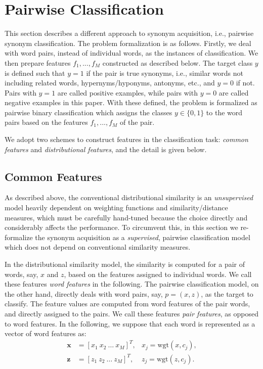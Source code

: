 \documentclass[english]{jnlp_1.4}
\begin{document}
\section{Pairwise Classification}

This section describes a different approach to synonym acquisition,
i.e., pairwise synonym classification. The problem formalization is as
follows. Firstly, we deal with word pairs, instead of individual
words, as the instances of classification. We then prepare features
$f_1, ..., f_M$ constructed as described below. The target class $y$
is defined such that $y = 1$ if the pair is true synonyms, i.e.,
similar words not including related words, hypernyms/hyponyms,
antonyms, etc., and $y = 0$ if not. Pairs with $y = 1$ are called
positive examples, while pairs with $y = 0$ are called negative
examples in this paper. With these defined, the problem is formalized
as pairwise binary classification which assigns the classes $y \in
\{0, 1\}$ to the word pairs based on the features $f_1, ..., f_M$ of
the pair.

We adopt two schemes to construct features in the classification task:
\textit{common features} and \textit{distributional features}, and the
detail is given below.


\subsection{Common Features}

As described above, the conventional distributional similarity is an
\textit{unsupervised} model heavily dependent on weighting functions and
similarity/distance measures, which must be carefully hand-tuned
because the choice directly and considerably affects the
performance. To circumvent this, in this section we re-formalize the
synonym acquisition as a \textit{supervised}, pairwise classification
model which does not depend on conventional similarity measures.

In the distributional similarity model, the similarity is computed for
a pair of words, say, $x$ and $z$, based on the features assigned to
individual words. We call these features \textit{word features} in the
following. The pairwise classification model, on the other hand,
directly deals with word pairs, say, $p = (x, z)$, as the target to
classify. The feature values are computed from word features of the
pair words, and directly assigned to the pairs. We call these features
\textit{pair features}, as opposed to word features. In the following,
we suppose that each word is represented as a vector of word features
as:
\begin{align}
\mathbf{x} & = [x_1\ x_2\ \dots\ x_M]^T, & x_j = \mathrm{wgt}(x, c_j),\\
\mathbf{z} & = [z_1\ z_2\ \dots\ z_M]^T, & z_j = \mathrm{wgt}(z, c_j).
\end{align}
\end{document}
